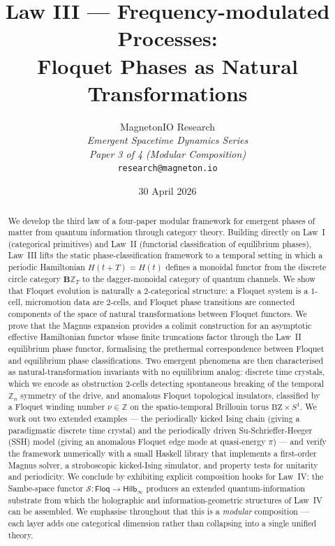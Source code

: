 \documentclass[12pt]{article}
\title{Law III --- Frequency-modulated Processes:\\
Floquet Phases as Natural Transformations}
\author{MagnetonIO Research \\
\textit{Emergent Spacetime Dynamics Series} \\
\textit{Paper 3 of 4 (Modular Composition)} \\
\texttt{research@magneton.io}}
\date{30 April 2026}
\theoremstyle{definition}
\theoremstyle{remark}
\newcommand{\Floq}{\mathsf{Floq}}
\newcommand{\Hilb}{\mathsf{Hilb}}
\begin{document}
\maketitle

\begin{abstract}
We develop the third law of a four-paper modular framework for emergent phases of matter from quantum information through category theory. Building directly on Law~I (categorical primitives) and Law~II (functorial classification of equilibrium phases), Law~III lifts the static phase-classification framework to a temporal setting in which a periodic Hamiltonian $H(t+T)=H(t)$ defines a monoidal functor from the discrete circle category $\mathbf{B}\mathbb{Z}_T$ to the dagger-monoidal category of quantum channels. We show that Floquet evolution is naturally a $2$-categorical structure: a Floquet system is a $1$-cell, micromotion data are $2$-cells, and Floquet phase transitions are connected components of the space of natural transformations between Floquet functors. We prove that the Magnus expansion provides a colimit construction for an asymptotic effective Hamiltonian functor whose finite truncations factor through the Law~II equilibrium phase functor, formalising the prethermal correspondence between Floquet and equilibrium phase classifications. Two emergent phenomena are then characterised as natural-transformation invariants with no equilibrium analog: discrete time crystals, which we encode as obstruction $2$-cells detecting spontaneous breaking of the temporal $\mathbb{Z}_n$ symmetry of the drive, and anomalous Floquet topological insulators, classified by a Floquet winding number $\nu\in\mathbb{Z}$ on the spatio-temporal Brillouin torus $\mathrm{BZ}\times S^1$. We work out two extended examples --- the periodically kicked Ising chain (giving a paradigmatic discrete time crystal) and the periodically driven Su-Schrieffer-Heeger (SSH) model (giving an anomalous Floquet edge mode at quasi-energy $\pi$) --- and verify the framework numerically with a small Haskell library that implements a first-order Magnus solver, a stroboscopic kicked-Ising simulator, and property tests for unitarity and periodicity. We conclude by exhibiting explicit composition hooks for Law~IV: the Sambe-space functor $\mathcal{S}\colon \Floq \to \Hilb_\infty$ produces an extended quantum-information substrate from which the holographic and information-geometric structures of Law~IV can be assembled. We emphasise throughout that this is a \emph{modular} composition --- each layer adds one categorical dimension rather than collapsing into a single unified theory.
\end{abstract}
\end{document}
